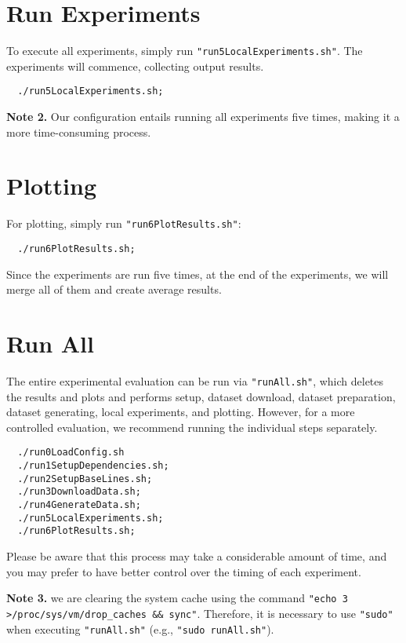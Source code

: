 \documentclass[acmsmall,screen,pdfa]{acmart}
\begin{document}
\section{Run Experiments}
To execute all experiments, simply run \texttt{"run5LocalExperiments.sh"}. The experiments will commence, collecting output results.
\begin{lstlisting}
  ./run5LocalExperiments.sh;
\end{lstlisting}

\textbf{Note 2.} Our configuration entails running all experiments five times, making it a more time-consuming process.

\section{Plotting}
For plotting, simply run \texttt{"run6PlotResults.sh"}: 
\begin{lstlisting}
  ./run6PlotResults.sh;
\end{lstlisting}

Since the experiments are run five times, at the end of the experiments, we will merge all of them and create average results.


\section{Run All}
The entire experimental evaluation can be run via \texttt{"runAll.sh"}, which deletes the results and plots and performs setup, dataset download, dataset preparation, dataset generating, local experiments, and plotting. However, for a more controlled evaluation, we recommend running the individual steps separately.

\begin{lstlisting}
  ./run0LoadConfig.sh
  ./run1SetupDependencies.sh;
  ./run2SetupBaseLines.sh;
  ./run3DownloadData.sh;
  ./run4GenerateData.sh;
  ./run5LocalExperiments.sh;
  ./run6PlotResults.sh;
\end{lstlisting}

Please be aware that this process may take a considerable amount of time, and you may prefer to have better control over the timing of each experiment. 

\textbf{Note 3.} we are clearing the system cache using the command \texttt{"echo 3 >/proc/sys/vm/drop\_caches \&\& sync"}. Therefore, it is necessary to use \texttt{"sudo"} when executing \texttt{"runAll.sh"} (e.g., \texttt{"sudo runAll.sh"}).



\balance


\end{document}
